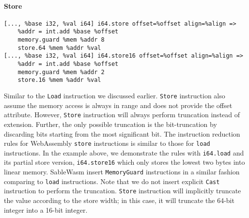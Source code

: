 \paragraph{Store} \quad
\begin{lstlisting}[basicstyle=\linespread{1}\small\ttfamily, language=SableWasmMIR]
[..., %base i32, %val i64] i64.store offset=%offset align=%align =>
    %addr = int.add %base %offset
    memory.guard %mem %addr 8
    store.64 %mem %addr %val
[..., %base i32, %val i64] i64.store16 offset=%offset align=%align =>
    %addr = int.add %base %offset
    memory.guard %mem %addr 2
    store.16 %mem %addr %val
\end{lstlisting}
Similar to the \texttt{Load} instruction we discussed earlier. \texttt{Store} instruction also assume the memory access is always in range and does not provide the offset attribute. However, \texttt{Store} instruction will always perform truncation instead of extension. Further, the only possible truncation is the bit-truncation by discarding bits starting from the most significant bit. The instruction reduction rules for WebAssembly \texttt{store} instructions is similar to those for \texttt{load} instructions. In the example above, we demonstrate the rules with \texttt{i64.load} and its partial store version, \texttt{i64.store16} which only stores the lowest two bytes into linear memory. SableWasm insert \texttt{MemoryGuard} instructions in a similar fashion comparing to \texttt{load} instructions. Note that we do not insert explicit \texttt{Cast} instruction to perform the truncation. \texttt{Store} instruction will implicitly truncate the value according to the store width; in this case, it will truncate the 64-bit integer into a 16-bit integer.

